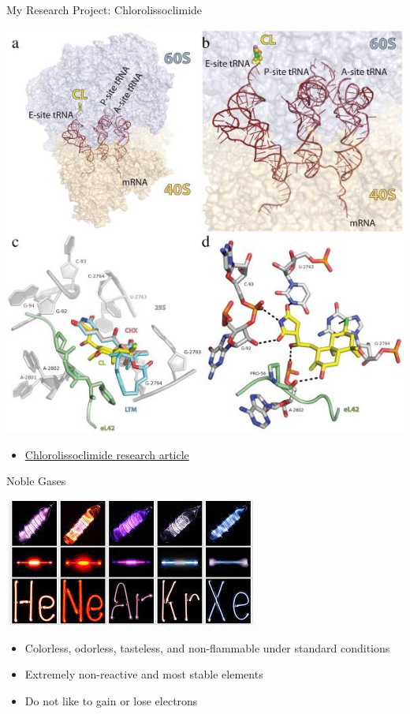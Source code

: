 \documentclass[11pt]{beamer}
\begin{document}
\begin{frame}{My Research Project: Chlorolissoclimide}
  \begin{center}
    \includegraphics[trim={0 4.2in 0 0},clip,scale=0.4]{lisso_drug}
  \end{center}

  \begin{itemize}
  \item \href{https://www.nature.com/articles/nchem.2800}
    {Chlorolissoclimide research article}
  \end{itemize}
\end{frame}

\begin{frame}{Noble Gases}
  \begin{center}
    \includegraphics[scale=0.7]{neon_lights}
  \end{center}
  
  \begin{itemize}
  \item Colorless, odorless, tasteless, and non-flammable
    under standard conditions
  \item Extremely non-reactive and most stable elements
  \item Do not like to gain or lose electrons
  \end{itemize}
\end{frame}
\end{document}
